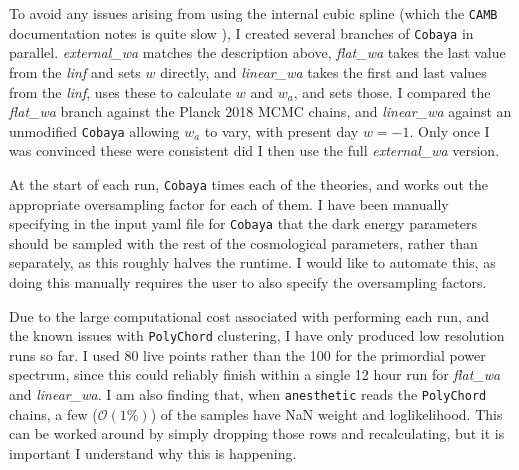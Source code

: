 \documentclass{article}
\begin{document}
To avoid any issues arising from using the internal cubic spline (which the \texttt{CAMB} documentation notes is quite slow \cite{CAMBdocs}), I created several branches of \texttt{Cobaya} in parallel. \textit{external\_wa} matches the description above, \textit{flat\_wa} takes the last value from the \textit{linf} and sets $w$ directly, and \textit{linear\_wa} takes the first and last values from the \textit{linf}, uses these to calculate $w$ and $w_a$, and sets those. I compared the \textit{flat\_wa} branch against the Planck 2018 MCMC chains, and \textit{linear\_wa} against an unmodified \texttt{Cobaya} allowing $w_a$ to vary, with present day $w=-1$. Only once I was convinced these were consistent did I then use the full \textit{external\_wa} version.

At the start of each run, \texttt{Cobaya} times each of the theories, and works out the appropriate oversampling factor for each of them. I have been manually specifying in the input yaml file for \texttt{Cobaya} that the dark energy parameters should be sampled with the rest of the cosmological parameters, rather than separately, as this roughly halves the runtime. I would like to automate this, as doing this manually requires the user to also specify the oversampling factors.

Due to the large computational cost associated with performing each run, and the known issues with \texttt{PolyChord} clustering, I have only produced low resolution runs so far. I used 80 live points rather than the 100 for the primordial power spectrum, since this could reliably finish within a single 12 hour run for \textit{flat\_wa} and \textit{linear\_wa}. I am also finding that, when \texttt{anesthetic} reads the \texttt{PolyChord} chains, a few ($\mathcal{O}(1\%)$) of the samples have NaN weight and loglikelihood. This can be worked around by simply dropping those rows and recalculating, but it is important I understand why this is happening. 
\end{document}
